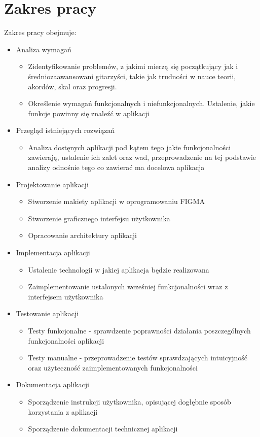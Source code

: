 \section{Zakres pracy}
Zakres pracy obejmuje:
\begin{itemize}
    \item Analiza wymagań
    \begin{itemize}
        \item Zidentyfikowanie problemów, z jakimi mierzą się początkujący jak i średniozaawansowani gitarzyści, takie jak trudności w nauce teorii, akordów, skal oraz progresji. 
        \item Określenie wymagań funkcjonalnych i niefunkcjonalnych. Ustalenie, jakie funkcje powinny się znaleźć w aplikacji
    \end{itemize}
    \item Przegląd istniejących rozwiązań
    \begin{itemize}
        \item Analiza dostęnych aplikacji pod kątem tego jakie funkcjonalności zawierają, ustalenie ich zalet oraz wad, przeprowadzenie na tej podstawie analizy odnośnie tego co zawierać ma docelowa aplikacja
    \end{itemize}
    \item Projektowanie aplikacji
    \begin{itemize}
        \item Stworzenie makiety aplikacji w oprogramowaniu FIGMA
        \item Stworzenie graficznego interfejsu użytkownika
        \item Opracowanie architektury aplikacji
    \end{itemize}
    \item Implementacja aplikacji
    \begin{itemize}
        \item Ustalenie technologii w jakiej aplikacja będzie realizowana
        \item Zaimplementowanie ustalonych wcześniej funkcjonalności wraz z interfejsem użytkownika
    \end{itemize}
    \item Testowanie aplikacji
    \begin{itemize}
        \item Testy funkcjonalne - sprawdzenie poprawności działania poszczególnych funkcjonalności aplikacji
        \item Testy manualne - przeprowadzenie testów sprawdzających intuicyjność oraz użyteczność zaimplementowanych funkcjonalności
    \end{itemize}
    \item Dokumentacja aplikacji
    \begin{itemize}
        \item Sporządzenie instrukcji użytkownika, opisującej dogłębnie sposób korzystania z aplikacji
        \item Sporządzenie dokumentacji technicznej aplikacji
    \end{itemize}
\end{itemize}


